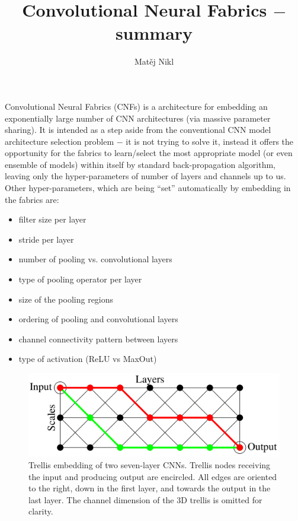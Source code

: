 \documentclass[a4paper,twocolumn]{article}
\title{Convolutional Neural Fabrics $-$ summary}
\author{Matěj Nikl}
\begin{document}
\maketitle
Convolutional Neural Fabrics (CNFs) is a architecture for embedding an exponentially large number of CNN architectures (via massive parameter sharing). It is intended as a step aside from the conventional CNN model architecture selection problem $-$  it is not trying to solve it, instead it offers the opportunity for the fabrics to learn/select the most appropriate model (or even ensemble of models) within itself by standard back-propagation algorithm, leaving only the hyper-parameters of number of layers and channels up to us.
Other hyper-parameters, which are being ``set'' automatically by embedding in the fabrics are:
\begin{itemize}
    \item filter size per layer
    \item stride per layer
    \item number of pooling vs. convolutional layers
    \item type of pooling operator per layer
    \item size of the pooling regions
    \item ordering of pooling and convolutional layers
    \item channel connectivity pattern between layers
    \item type of activation (ReLU vs MaxOut)
\end{itemize}


\begin{figure}[!h]
    \includegraphics[width=\columnwidth]{fabrics1.png}
    \caption{Trellis embedding of two seven-layer CNNs. Trellis nodes receiving the input and producing output are encircled. All edges are oriented to the right, down in the first layer, and towards the output in the last layer. The channel dimension of the 3D trellis is omitted for clarity.}
\end{figure}
\end{document}
